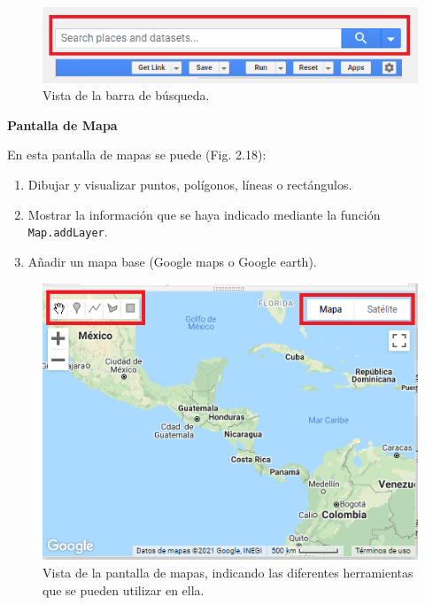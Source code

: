 \documentclass[
  12pt,
  letterpaper,
  twoside]{book}
\providecommand{\tightlist}{%
  \setlength{\itemsep}{0pt}\setlength{\parskip}{0pt}}
\begin{document}
\begin{figure}[btp]

{\centering \includegraphics[width=0.8\linewidth]{Img/search} 

}

\caption{Vista de la barra de búsqueda.}\label{fig:unnamed-chunk-18}
\end{figure}

\textbf{Pantalla de Mapa}

En esta pantalla de mapas se puede (Fig. 2.18):

\begin{enumerate}
\def\labelenumi{\arabic{enumi}.}
\tightlist
\item
  Dibujar y visualizar puntos, polígonos, líneas o rectángulos.
\item
  Mostrar la información que se haya indicado mediante la función \texttt{Map.addLayer}.
\item
  Añadir un mapa base (Google maps o Google earth).
\end{enumerate}

\begin{figure}[btp]

{\centering \includegraphics[width=0.8\linewidth]{Img/drawing} 

}

\caption{Vista de la pantalla de mapas, indicando las diferentes herramientas que se pueden utilizar en ella.}\label{fig:unnamed-chunk-19}
\end{figure}
\end{document}
